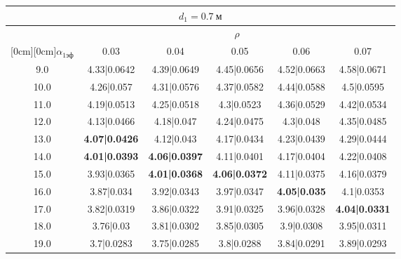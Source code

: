 \documentclass[20pt]{article}
\begin{document}
\begin{center}
\begin{tabular}{c|ccccc}
\hline
	\multicolumn{6}{c}{$d_{1}=0.7 \ м$} \\
\hline
	 & \multicolumn{5}{|c}{$\rho$} \\
	\cline{2-6}
	\raisebox{1.5ex}[0cm][0cm]{$\alpha_{1эф}$} & 0.03 & 0.04 & 0.05 & 0.06 & 0.07\\
\hline
	9.0 & 	4.33|0.0642 & 	4.39|0.0649 & 	4.45|0.0656 & 	4.52|0.0663 & 	4.58|0.0671\\
	10.0 & 	4.26|0.057 & 	4.31|0.0576 & 	4.37|0.0582 & 	4.44|0.0588 & 	4.5|0.0595\\
	11.0 & 	4.19|0.0513 & 	4.25|0.0518 & 	4.3|0.0523 & 	4.36|0.0529 & 	4.42|0.0534\\
	12.0 & 	4.13|0.0466 & 	4.18|0.047 & 	4.24|0.0475 & 	4.3|0.048 & 	4.35|0.0485\\
	13.0 & 	\textbf{4.07|0.0426} & 	4.12|0.043 & 	4.17|0.0434 & 	4.23|0.0439 & 	4.29|0.0444\\
	14.0 & 	\textbf{4.01|0.0393} & 	\textbf{4.06|0.0397} & 	4.11|0.0401 & 	4.17|0.0404 & 	4.22|0.0408\\
	15.0 & 	3.93|0.0365 & 	\textbf{4.01|0.0368} & 	\textbf{4.06|0.0372} & 	4.11|0.0375 & 	4.16|0.0379\\
	16.0 & 	3.87|0.034 & 	3.92|0.0343 & 	3.97|0.0347 & 	\textbf{4.05|0.035} & 	4.1|0.0353\\
	17.0 & 	3.82|0.0319 & 	3.86|0.0322 & 	3.91|0.0325 & 	3.96|0.0328 & 	\textbf{4.04|0.0331}\\
	18.0 & 	3.76|0.03 & 	3.81|0.0302 & 	3.85|0.0305 & 	3.9|0.0308 & 	3.95|0.0311\\
	19.0 & 	3.7|0.0283 & 	3.75|0.0285 & 	3.8|0.0288 & 	3.84|0.0291 & 	3.89|0.0293\\
\end{tabular}


\end{center}
\end{document}

